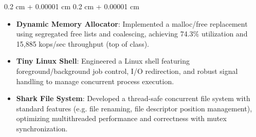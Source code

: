 \documentclass[10pt, letterpaper]{article}
\newenvironment{highlights}{
    \begin{itemize}[
        topsep=0.10 cm,
        parsep=0.10 cm,
        partopsep=0pt,
        itemsep=0pt,
        leftmargin=0.4 cm + 10pt
    ]
}{
    \end{itemize}
} %
\newenvironment{onecolentry}{
    \begin{adjustwidth}{
        0.2 cm + 0.00001 cm
    }{
        0.2 cm + 0.00001 cm
    }
}{
    \end{adjustwidth}
} %
\newenvironment{twocolentry}[2][]{
    \onecolentry
    \def\secondColumn{#2}
    \setcolumnwidth{\fill, 4.5 cm}
    \begin{paracol}{2}
}{
    \switchcolumn \raggedleft \secondColumn
    \end{paracol}
    \endonecolentry
} %
\begin{document}
        \vspace{0.10 cm}
        \begin{onecolentry}
            \begin{highlights}
                \item \textbf{Dynamic Memory Allocator}: Implemented a malloc/free replacement using segregated free lists and coalescing, achieving 74.3\% utilization and 15,885 kops/sec throughput (top of class).
                \item \textbf{Tiny Linux Shell}: Engineered a Linux shell featuring foreground/background job control, I/O redirection, and robust signal handling to manage concurrent process execution.
                \item \textbf{Shark File System}: Developed a thread-safe concurrent file system with standard features (e.g. file renaming, file descriptor position management), optimizing multithreaded performance and correctness with mutex synchronization.
            \end{highlights}
        \end{onecolentry}

\end{document}

